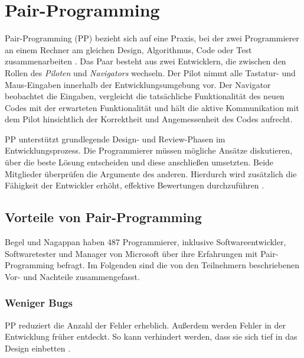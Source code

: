 \section{Pair-Programming} \label{sec:pp}

Pair-Programming (PP) bezieht sich auf eine Praxis, bei der zwei Programmierer an einem Rechner am gleichen Design, Algorithmus, Code oder Test zusammenarbeiten \cite{Williams2003BuildingExperiments}. Das Paar besteht aus zwei Entwicklern, die zwischen den Rollen des \textit{Piloten} und \textit{Navigators} wechseln. Der Pilot nimmt alle Tastatur- und Maus-Eingaben innerhalb der Entwicklungsumgebung vor. Der Navigator beobachtet die Eingaben, vergleicht die tatsächliche Funktionalität des neuen Codes mit der erwarteten Funktionalität und hält die aktive Kommunikation mit dem Pilot hinsichtlich der Korrektheit und Angemessenheit des Codes aufrecht.

PP unterstützt grundlegende Design- und Review-Phasen im Entwicklungsprozess. Die Programmierer müssen mögliche Ansätze diskutieren, über die beste Lösung entscheiden und diese anschließen umsetzten. Beide Mitglieder überprüfen die Argumente des anderen. Hierdurch wird zusätzlich die Fähigkeit der Entwickler erhöht, effektive Bewertungen durchzuführen \cite{Bevan2002GuidelinesClass,Alshehri2014RankingProgramming,Williams2010PairProgramming}.


\subsection{Vorteile von Pair-Programming} Begel und Nagappan \cite{Begel2008PairMe} haben 487 Programmierer, inklusive Softwareentwickler, Softwaretester und Manager von Microsoft über ihre Erfahrungen mit Pair-Programming befragt. Im Folgenden sind die von den Teilnehmern beschriebenen Vor- und Nachteile zusammengefasst.




\subsubsection{ Weniger Bugs} PP reduziert die Anzahl der Fehler erheblich. Außerdem werden Fehler in der Entwicklung früher entdeckt. So kann verhindert werden, dass sie sich tief in das Design einbetten \cite{Begel2008PairMe}.

